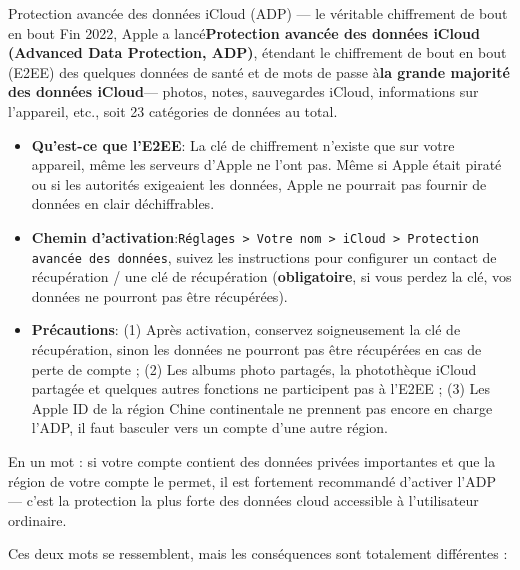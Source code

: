 \begin{tcbwarn}{Protection avancée des données iCloud (ADP) — le véritable chiffrement de bout en bout}
Fin 2022, Apple a lancé\textbf{Protection avancée des données iCloud (Advanced Data Protection, ADP)}, étendant le chiffrement de bout en bout (E2EE) des quelques données de santé et de mots de passe à\textbf{la grande majorité des données iCloud}— photos, notes, sauvegardes iCloud, informations sur l'appareil, etc., soit 23 catégories de données au total.

\begin{itemize}
  \item \textbf{Qu'est-ce que l'E2EE}: La clé de chiffrement n'existe que sur votre appareil, même les serveurs d'Apple ne l'ont pas. Même si Apple était piraté ou si les autorités exigeaient les données, Apple ne pourrait pas fournir de données en clair déchiffrables.
  \item \textbf{Chemin d'activation}:\texttt{Réglages > Votre nom > iCloud > Protection avancée des données}, suivez les instructions pour configurer un contact de récupération / une clé de récupération (\textbf{obligatoire}, si vous perdez la clé, vos données ne pourront pas être récupérées).
  \item \textbf{Précautions}: (1) Après activation, conservez soigneusement la clé de récupération, sinon les données ne pourront pas être récupérées en cas de perte de compte ; (2) Les albums photo partagés, la photothèque iCloud partagée et quelques autres fonctions ne participent pas à l'E2EE ; (3) Les Apple ID de la région Chine continentale ne prennent pas encore en charge l'ADP, il faut basculer vers un compte d'une autre région.
\end{itemize}

En un mot : si votre compte contient des données privées importantes et que la région de votre compte le permet, il est fortement recommandé d'activer l'ADP — c'est la protection la plus forte des données cloud accessible à l'utilisateur ordinaire.

\end{tcbwarn}


Ces deux mots se ressemblent, mais les conséquences sont totalement différentes :

